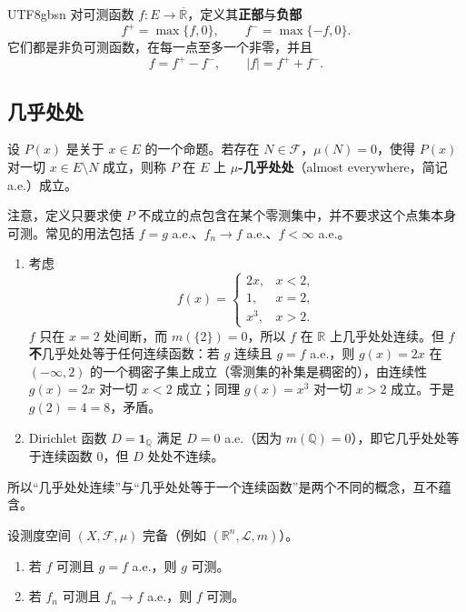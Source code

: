 \documentclass[11pt]{article}
\makeatletter
\newcommand{\envlabel}[1]{\protected@edef\@currentlabel{\themathenv}\label{#1}}
\makeatother
\begin{document}
\begin{CJK*}{UTF8}{gbsn}
对可测函数 $f:E\to\overline{\mathbb{R}}$，定义其\textbf{正部}与\textbf{负部}
\[
f^{+}=\max\{f,0\},\qquad f^{-}=\max\{-f,0\}.
\]
它们都是非负可测函数，在每一点至多一个非零，并且
\[
f=f^{+}-f^{-},\qquad |f|=f^{+}+f^{-}.
\]

\subsection{几乎处处}

\begin{definition}[几乎处处]
设 $P(x)$ 是关于 $x\in E$ 的一个命题。若存在 $N\in\mathcal{F}$，$\mu(N)=0$，使得 $P(x)$ 对一切 $x\in E\setminus N$ 成立，则称 $P$ 在 $E$ 上 \textbf{$\mu$-几乎处处}（almost everywhere，简记 a.e.）成立。
\end{definition}

注意，定义只要求使 $P$ 不成立的点包含在某个零测集中，并不要求这个点集本身可测。常见的用法包括 $f=g$ a.e.、$f_{n}\to f$ a.e.、$f<\infty$ a.e.。

\begin{example}\envlabel{zh:ex:ae}
\leavevmode
\begin{enumerate}
  \item 考虑
  \[
  f(x)=\begin{cases}2x,&x<2,\\1,&x=2,\\x^{3},&x>2.\end{cases}
  \]
  $f$ 只在 $x=2$ 处间断，而 $m(\{2\})=0$，所以 $f$ 在 $\mathbb{R}$ 上几乎处处连续。但 $f$ \textbf{不}几乎处处等于任何连续函数：若 $g$ 连续且 $g=f$ a.e.，则 $g(x)=2x$ 在 $(-\infty,2)$ 的一个稠密子集上成立（零测集的补集是稠密的），由连续性 $g(x)=2x$ 对一切 $x<2$ 成立；同理 $g(x)=x^{3}$ 对一切 $x>2$ 成立。于是 $g(2)=4=8$，矛盾。
  \item Dirichlet 函数 $D=\mathbf{1}_{\mathbb{Q}}$ 满足 $D=0$ a.e.（因为 $m(\mathbb{Q})=0$），即它几乎处处等于连续函数 $0$，但 $D$ 处处不连续。
\end{enumerate}
所以“几乎处处连续”与“几乎处处等于一个连续函数”是两个不同的概念，互不蕴含。
\end{example}

\begin{proposition}\envlabel{zh:prop:complete}
设测度空间 $(X,\mathcal{F},\mu)$ 完备（例如 $(\mathbb{R}^{n},\mathcal{L},m)$）。
\begin{enumerate}
  \item 若 $f$ 可测且 $g=f$ a.e.，则 $g$ 可测。
  \item 若 $f_{n}$ 可测且 $f_{n}\to f$ a.e.，则 $f$ 可测。
\end{enumerate}
\end{proposition}


\end{CJK*}
\end{document}

